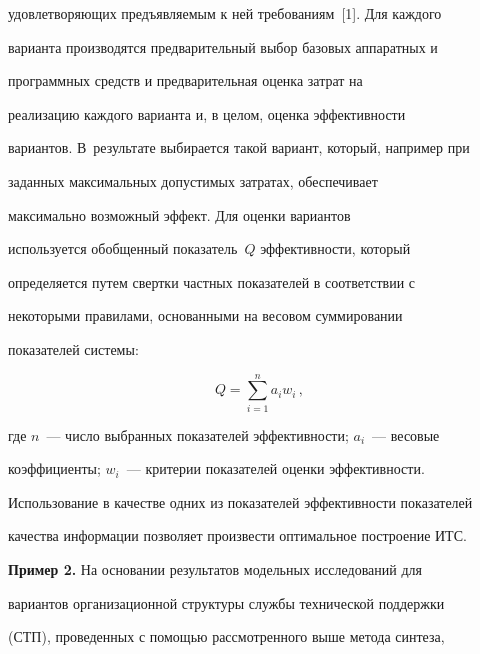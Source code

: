 удовлетворяющих предъявляемым к ней требованиям~[1]. Для каждого 


варианта производятся предварительный выбор базовых аппаратных и 


программных средств и предварительная оценка затрат на 


реализацию каждого варианта и, в целом, оценка эффективности 


вариантов. В~результате выбирается такой вариант, который, например при 


заданных максимальных допустимых затратах, обеспечивает 


        мак\-си\-маль\-но воз\-мож\-ный эффект. Для оценки вариантов 


используется обобщенный показатель~$Q$ эф\-фектив\-ности, который 


определяется путем свертки частных показателей в соответствии с 


некоторыми правилами, основанными на весовом суммировании 


показателей системы:


        \begin{equation*}


        Q=\sum\limits_{i=1}^n a_i w_i\,,




        \end{equation*}


где $n$~--- число выбранных показателей эффективности; $a_i$~--- весовые 


коэффициенты; $w_i$~--- критерии показателей оценки эффективности.





Использование в качестве одних из показателей эффективности показателей 


качества информации позволяет произвести оптимальное построение ИТС.





\medskip





\noindent


\textbf{Пример 2.} На основании результатов модельных исследований для 


вариантов организационной структуры службы технической поддержки 


(СТП), проведенных с помощью рассмотренного выше метода синтеза, 


